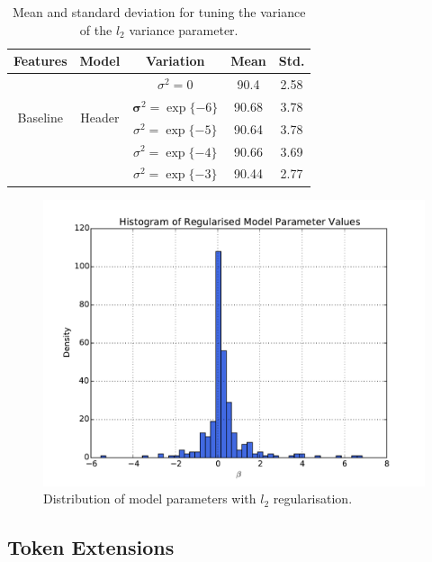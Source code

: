\begin{table}[h]
\begin{center}
\begin{tabular}{|c|c|c|c|c|}
\hline
Features & Model & Variation & Mean & Std.\\
\hline
\multirow{4}{*}{Baseline} & \multirow{4}{*}{Header} & $\sigma^2 = 0$ & 90.4 & 2.58\\
& & $\mathbf \sigma^2 = \exp\{-6\}$ & 90.68 & 3.78\\
& & $\sigma^2 = \exp\{-5\}$ & 90.64 & 3.78\\
& & $\sigma^2 = \exp\{-4\}$ & 90.66 & 3.69\\
& & $\sigma^2 = \exp\{-3\}$ & 90.44 & 2.77\\
\hline
\end{tabular}
\caption[Mean and standard deviation for tuning the variance of the $l_2$ variance parameter.]{Mean and standard deviation for tuning the variance of the $l_2$ variance parameter.}
\label{table:regularisationresults}
\end{center}
\end{table}

\begin{figure}[h]
\center
\includegraphics[width=5in]{Figures/histogram.pdf}
\caption{Distribution of model parameters with $l_2$ regularisation.}
\label{fig:histogram}
\end{figure}

\subsection{Token Extensions}
\label{subsec:tokenextensionresults}

